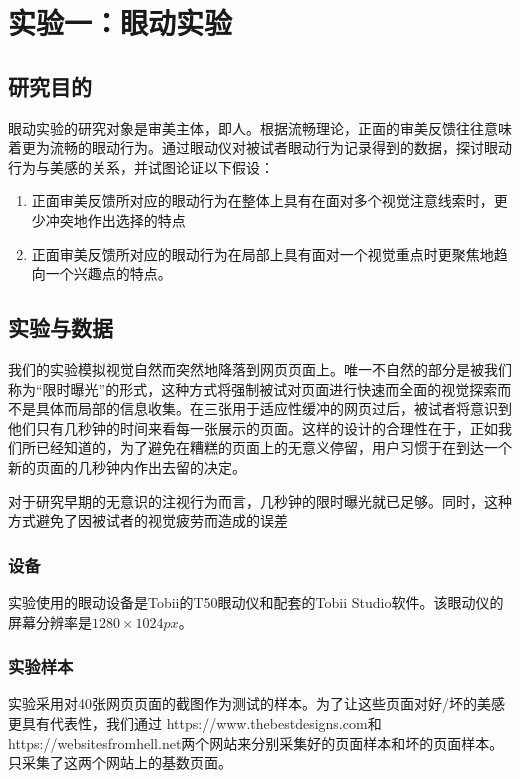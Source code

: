 \chapter{实验一：眼动实验}
\label{exp1}

\section{研究目的}
眼动实验的研究对象是审美主体，即人。根据流畅理论，正面的审美反馈往往意味着更为流畅的眼动行为。通过眼动仪对被试者眼动行为记录得到的数据，探讨眼动行为与美感的关系，并试图论证以下假设：

\begin{enumerate}
  \item 正面审美反馈所对应的眼动行为在整体上具有在面对多个视觉注意线索时，更少冲突地作出选择的特点
  \item 正面审美反馈所对应的眼动行为在局部上具有面对一个视觉重点时更聚焦地趋向一个兴趣点的特点。
\end{enumerate}

\section{实验与数据}
我们的实验模拟视觉自然而突然地降落到网页页面上。唯一不自然的部分是被我们称为“限时曝光”的形式，这种方式将强制被试对页面进行快速而全面的视觉探索而不是具体而局部的信息收集。在三张用于适应性缓冲的网页过后，被试者将意识到他们只有几秒钟的时间来看每一张展示的页面。这样的设计的合理性在于，正如我们所已经知道的，为了避免在糟糕的页面上的无意义停留，用户习惯于在到达一个新的页面的几秒钟内作出去留的决定。

对于研究早期的无意识的注视行为而言，几秒钟的限时曝光就已足够。同时，这种方式避免了因被试者的视觉疲劳而造成的误差

\subsection{设备}
实验使用的眼动设备是Tobii的T50眼动仪和配套的Tobii Studio软件。该眼动仪的屏幕分辨率是$1280\times1024px$。

\subsection{实验样本}
实验采用对40张网页页面的截图作为测试的样本。为了让这些页面对好/坏的美感更具有代表性，我们通过 {https://www.thebestdesigns.com}和{https://websitesfromhell.net}两个网站来分别采集好的页面样本和坏的页面样本。只采集了这两个网站上的基数页面。

